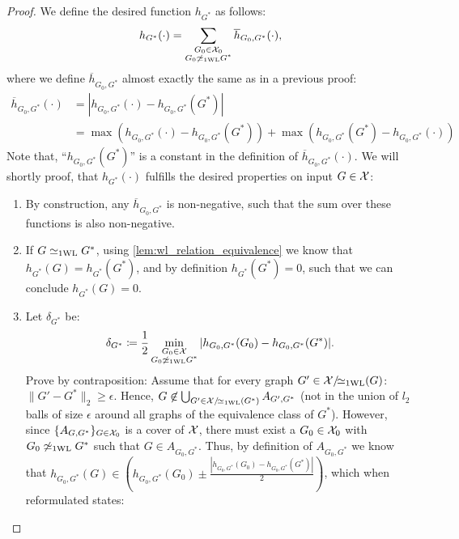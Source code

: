 \begin{proof}
    We define the desired function $h_{G^*}$ as follows:
    \begin{equation}\label{eq:continuous_proof4}
        h_{G^*}(\cdot) = \sum_{\substack{G_0 \in \mathcal{X}_0 \\ G_0 \not\simeq_{\text{1WL}} G^*}} \overline{h}_{G_0, G^*}(\cdot),
    \end{equation}
    where we define $\overline{h}_{G_0, G^*}$ almost exactly the same as in a previous proof:
    \begin{align}
        \overline{h}_{G_0, G^*}(\cdot) &= |h_{G_0, G^*}(\cdot) - h_{G_0, G^*}(G^*)| \\
        &= \max(h_{G_0, G^*}(\cdot) - h_{G_0, G^*}(G^*)) + \max(h_{G_0, G^*}(G^*) - h_{G_0, G^*}(\cdot))\label{eq:continuous_proof5}
    \end{align}
    Note that, ``$ h_{G_0, G^*}(G^*)$'' is a constant in the definition of $\overline{h}_{G_0, G^*}(\cdot)$. We will shortly proof, that $h_{G^*}(\cdot)$ fulfills the desired properties on input $G \in \mathcal{X}$:
    \begin{enumerate}
        \item By construction, any $\overline{h}_{G_0, G^*}$ is non-negative, such that the sum over these functions is also non-negative.
        \item If $G \simeq_{\text{1WL}} G^*$, using \autoref{lem:wl_relation_equivalence} we know that $h_{G^*}(G) = h_{G^*}(G^*)$, and by definition $h_{G^*}(G^*) = 0$, such that we can conclude $h_{G^*}(G)=0$.
        \item Let $\delta_{G^*}$ be:
        \begin{equation*}
            \delta_{G^*} \coloneqq \frac{1}{2} \min_{\substack{G_0 \in \mathcal{X}\\G_0 \not\simeq_{\text{1WL}} G^*}} |h_{G_0, G^*}(G_0) - h_{G_0, G^*}(G^*)|.
        \end{equation*}
        Prove by contraposition: Assume that for every graph $G' \in \mathcal{X}/\!{\simeq_{\text{1WL}}}(G)$: $\| G' - G^* \|_2 \geq \epsilon$. Hence, $G \not\in \bigcup_{G' \in \mathcal{X}/\!{\simeq_{\text{1WL}}}(G^*)} A_{G', G^*}$ (not in the union of $l_2$ balls of size $\epsilon$ around all graphs of the equivalence class of $G^*$). However, since $\{ A_{G, G^*} \}_{G \in \mathcal{X}_0}$ is a cover of $\mathcal{X}$, there must exist a $G_0 \in \mathcal{X}_0$ with $G_0 \not\simeq_{\text{1WL}} G^*$ such that $G \in A_{G_0, G^*}$. Thus, by definition of $A_{G_0, G^*}$ we know that $h_{G_0, G^*}(G) \in (h_{G_0, G^*}(G_0) \pm \frac{|h_{G_0, G^*}(G_0) - h_{G_0, G^*}(G^*)|}{2})$, which when reformulated states:
        \begin{equation}\label{eq:continuous_proof3}

\end{equation}
\end{enumerate}
\end{proof}
